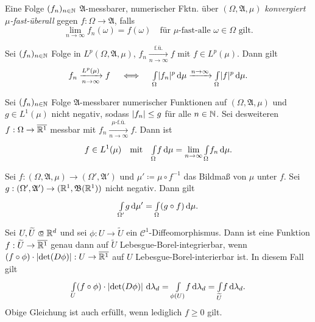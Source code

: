 \documentclass{cheat-sheet}
\newcommand{\Alg}{\mathfrak{A}} %
\newcommand{\Bor}{\mathfrak{B}} %
\renewcommand{\ER}{\overline{\R^1}} %
\begin{document}


\begin{defn}
  Eine Folge $(f_n)_{n \in \mathbb{N}}$ $\Alg$-messbarer, numerischer Fktn. über $(\Omega, \Alg, \mu)$ \emph{konvergiert $\mu$-fast-überall} gegen $f : \Omega \to \Alg$, falls
  \[ \lim_{n \to \infty} f_n(\omega) = f(\omega) \quad \text{für $\mu$-fast-alle $\omega \in \Omega$ gilt.} \]
\end{defn}


\begin{satz}[Riesz]
  Sei $(f_n)_{n \in \mathbb{N}}$ Folge in $L^p(\Omega, \Alg, \mu)$, $f_n \xrightarrow[n \to \infty]{\text{f.ü.}} f$ mit $f \in L^p(\mu)$. Dann gilt
  \[ f_n \xrightarrow[n \to \infty]{L^p(\mu)} f \quad \iff \quad {\textstyle \int\limits_{\Omega}^{}} \lvert f_n\rvert^p \,\mathrm{d} \mu \xrightarrow{n \to \infty} {\textstyle \int\limits_{\Omega}^{}} \lvert f\rvert^p \,\mathrm{d} \mu. \]
\end{satz}


\begin{satz}
  Sei $(f_n)_{n \in \mathbb{N}}$ Folge $\Alg$-messbarer numerischer Funktionen auf $(\Omega, \Alg, \mu)$ und $g \in L^1(\mu)$ nicht negativ, sodass $\lvert f_n\rvert \leq g$ für alle $n \in \mathbb{N}$. Sei desweiteren $f : \Omega \to \ER$ messbar mit $f_n \xrightarrow[n \to \infty]{\text{$\mu$-f.ü.}} f$. Dann ist
  \[ f \in L^1(\mu) \quad \text{mit} \quad {\textstyle \int\limits_{\Omega}^{}} f \,\mathrm{d} \mu = \lim_{n \to \infty} {\textstyle \int\limits_{\Omega}^{}} f_n \,\mathrm{d} \mu. \]
\end{satz}


\begin{satz}
  Sei $f : (\Omega, \Alg, \mu) \to (\Omega', \Alg')$ und $\mu' \coloneqq \mu \circ f^{-1}$ das Bildmaß von $\mu$ unter $f$. Sei $g : (\Omega', \Alg') \to (\R^1, \Bor(\R^1))$ nicht negativ. Dann gilt
  \[ {\textstyle \int\limits_{\Omega'}^{}} g \,\mathrm{d} \mu' = {\textstyle \int\limits_{\Omega}^{}} (g \circ f) \,\mathrm{d} \mu. \]
\end{satz}


\begin{satz}[Transformationssatz]
  Sei $U, \widetilde{U} \opn \R^d$ und sei $\phi : U \to \widetilde{U}$ ein $\mathcal{C}^1$-Diffeomorphismus. Dann ist eine Funktion $f : \widetilde{U} \to \ER$ genau dann auf $\widetilde{U}$ Lebesgue-Borel-integrierbar, wenn $(f \circ \phi) \cdot \left|\det(D\phi)\right| : U \to \ER$ auf $U$ Lebesgue-Borel-interierbar ist. In diesem Fall gilt
  \[ {\textstyle \int\limits_{U}^{}} (f \circ \phi) \cdot \left|\det(D\phi)\right| \,\mathrm{d} \lambda_d = {\textstyle \int\limits_{\phi(U)}^{}} f \,\mathrm{d} \lambda_d = {\textstyle \int\limits_{\widetilde{U}}^{}} f \,\mathrm{d} \lambda_d. \]
  Obige Gleichung ist auch erfüllt, wenn lediglich $f \geq 0$ gilt.
\end{satz}
\end{document}
